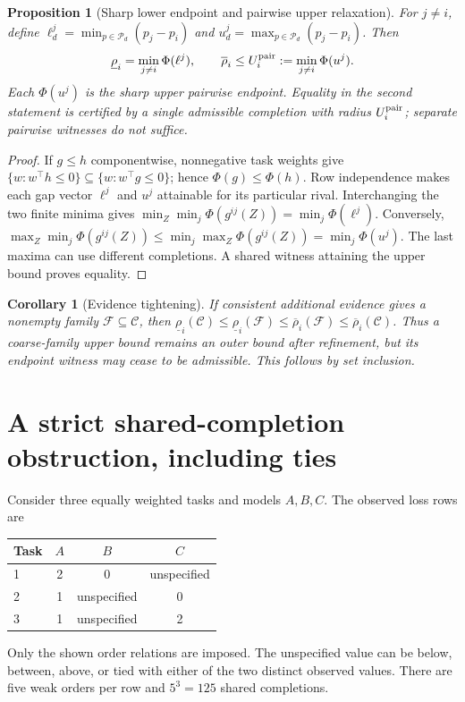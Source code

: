 \documentclass[11pt,a4paper]{article}
\newtheorem{proposition}{Proposition}
\newtheorem{corollary}{Corollary}
\newcommand{\C}{\mathcal C}
\newcommand{\Pset}{\mathcal P}
\newcommand{\rlo}{\underline{\rho}}
\newcommand{\rhi}{\overline{\rho}}
\begin{document}
\begin{proposition}[Sharp lower endpoint and pairwise upper relaxation]
For $j\ne i$, define
$\ell_d^j=\min_{p\in\Pset_d}(p_j-p_i)$ and
$u_d^j=\max_{p\in\Pset_d}(p_j-p_i)$. Then
\begin{equation}\label{eq:bounds}
\rlo_i=\min_{j\ne i}\Phi(\ell^j),\qquad
\rhi_i\leq U_i^{\rm pair}:=\min_{j\ne i}\Phi(u^j).
\end{equation}
Each $\Phi(u^j)$ is the sharp upper \emph{pairwise} endpoint. Equality in the
second statement is certified by a single admissible completion with radius
$U_i^{\rm pair}$; separate pairwise witnesses do not suffice.
\end{proposition}
\begin{proof}
If $g\leq h$ componentwise, nonnegative task weights give
$\{w:w^\top h\leq0\}\subseteq\{w:w^\top g\leq0\}$; hence
$\Phi(g)\leq\Phi(h)$. Row independence makes each gap vector $\ell^j$ and $u^j$
attainable for its particular rival. Interchanging the two finite minima gives
$\min_Z\min_j\Phi(g^{ij}(Z))=\min_j\Phi(\ell^j)$. Conversely,
$\max_Z\min_j\Phi(g^{ij}(Z))\leq\min_j\max_Z\Phi(g^{ij}(Z))
=\min_j\Phi(u^j)$. The last maxima can use different completions. A shared
witness attaining the upper bound proves equality.
\end{proof}
\begin{corollary}[Evidence tightening]
If consistent additional evidence gives a nonempty family $\mathcal F\subseteq\C$,
then $\rlo_i(\C)\leq\rlo_i(\mathcal F)\leq\rhi_i(\mathcal F)\leq\rhi_i(\C)$.
Thus a coarse-family upper bound remains an outer bound after refinement, but
its endpoint witness may cease to be admissible. This follows by set inclusion.
\end{corollary}

\newpage
\section{A strict shared-completion obstruction, including ties}
Consider three equally weighted tasks and models $A,B,C$. The observed loss
rows are
\begin{center}
\begin{tabular}{lccc}\toprule
Task & $A$ & $B$ & $C$\\\midrule
1 & 2 & 0 & unspecified\\
2 & 1 & unspecified & 0\\
3 & 1 & unspecified & 2\\\bottomrule
\end{tabular}
\end{center}
Only the shown order relations are imposed. The unspecified value can be below,
between, above, or tied with either of the two distinct observed values. There
are five weak orders per row and $5^3=125$ shared completions.
\end{document}
